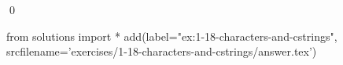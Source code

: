 
\begin{ex}
  \label{ex:1-18-characters-and-cstrings}
  
  \qed
\end{ex}
\begin{python0}
from solutions import *
add(label="ex:1-18-characters-and-cstrings",
    srcfilename='exercises/1-18-characters-and-cstrings/answer.tex')
\end{python0}
